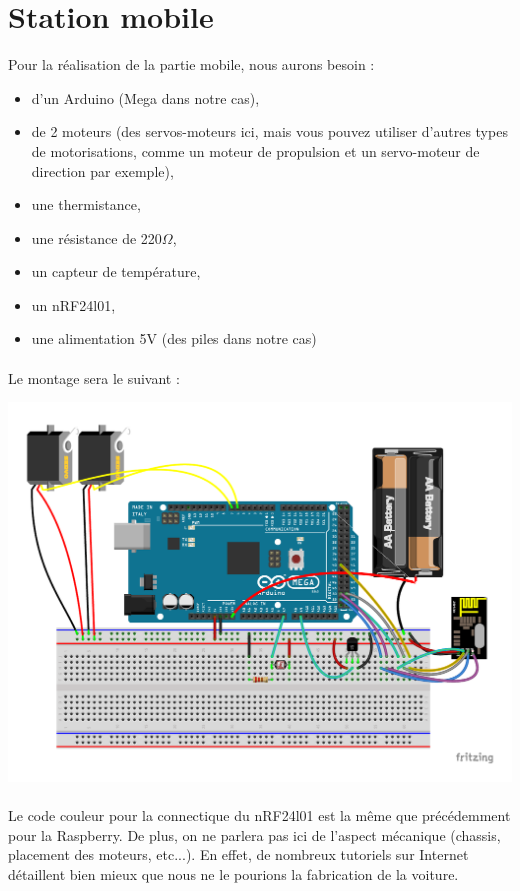 \section{Station mobile}
Pour la réalisation de la partie mobile, nous aurons besoin :
\begin{itemize}
\item d'un Arduino (Mega dans notre cas),
\item de 2 moteurs (des servos-moteurs ici, mais vous pouvez utiliser d'autres
types de motorisations, comme un moteur de propulsion et un servo-moteur de 
direction par exemple),
\item une thermistance,
\item une résistance de 220$\Omega$,
\item un capteur de température,
\item un nRF24l01,
\item une alimentation 5V (des piles dans notre cas)
\end{itemize}

\paragraph{}
Le montage sera le suivant :
\begin{center}
\includegraphics[scale=0.7]{include/arduino_bb.pdf}
\end{center}

\paragraph{}
Le code couleur pour la connectique du nRF24l01 est la même que précédemment
pour la Raspberry. De plus, on ne parlera pas ici de l'aspect mécanique 
(chassis, placement des moteurs, etc...). En effet, de nombreux tutoriels sur
Internet détaillent bien mieux que nous ne le pourions la fabrication de la
voiture.
